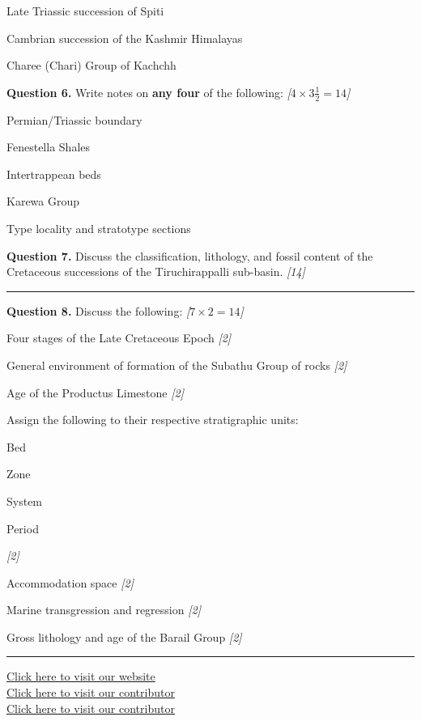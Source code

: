 \documentclass[11pt,a4paper]{article}
\newcommand{\pts}[1]{\hfill   \textit{[#1]}}
\begin{document}
\begin{parts}
  \item Late Triassic succession of Spiti
  \item Cambrian succession of the Kashmir Himalayas
  \item Charee (Chari) Group of Kachchh
\end{parts}

\medskip


\noindent   \textbf{Question 6.} Write notes on   \textbf{any four} of the following: \pts{$4  \times 3\frac{1}{2} = 14$}

\begin{parts}
  \item Permian/Triassic boundary
  \item Fenestella Shales
  \item Intertrappean beds
  \item Karewa Group
  \item Type locality and stratotype sections
\end{parts}

\medskip


\noindent   \textbf{Question 7.} Discuss the classification, lithology, and fossil content of the Cretaceous successions of the Tiruchirappalli sub-basin. \pts{14}

\bigskip


\rule{\linewidth}{0.4pt}\smallskip




\noindent   \textbf{Question 8.} Discuss the following: \pts{$7  \times 2 = 14$}

\begin{parts}
  \item Four stages of the Late Cretaceous Epoch \pts{2}
  \item General environment of formation of the Subathu Group of rocks \pts{2}
  \item Age of the Productus Limestone \pts{2}
  \item Assign the following to their respective stratigraphic units:
  
\begin{subparts}
    \item Bed
    \item Zone
    \item System
    \item Period
  \end{subparts} \pts{2}
  \item Accommodation space \pts{2}
  \item Marine transgression and regression \pts{2}
  \item Gross lithology and age of the Barail Group \pts{2}
\end{parts}

\vfill\rule{\linewidth}{0.4pt}

\begin{center}\small
\href{https://bhu-exam.vercel.app/}{Click here to visit our website}\\[4pt]
\href{https://me-aryan.vercel.app/}{Click here to visit our contributor}\\[4pt]
\href{https://quashan-me.vercel.app/}{Click here to visit our contributor}
\end{center}
\end{document}

